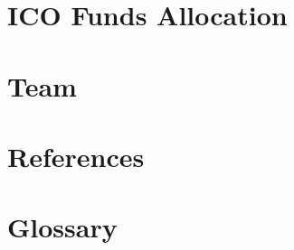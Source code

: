 \documentclass[10pt]{article}
\begin{document}
\section{ICO Funds Allocation}



\section{Team}

\section{References}

\section{Glossary}
\end{document}
